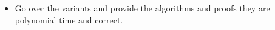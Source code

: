\begin{itemize}
	\item Go over the variants and provide the algorithms and proofs they are
	polynomial time and correct.
\end{itemize}